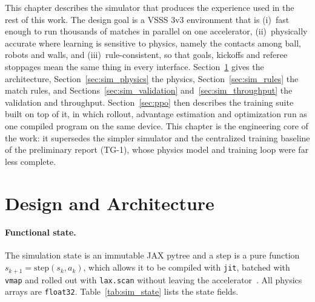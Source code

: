 
This chapter describes the simulator that produces the experience used in the
rest of this work.  The design goal is a VSSS 3v3 environment that is
(i)~fast enough to run thousands of matches in parallel on one accelerator,
(ii)~physically accurate where learning is sensitive to physics, namely the contacts
among ball, robots and walls, and (iii)~rule-consistent, so that goals,
kickoffs and referee stoppages mean the same thing in every interface.
Section~\ref{sec:sim_arch} gives the architecture, Section~\ref{sec:sim_physics}
the physics, Section~\ref{sec:sim_rules} the match rules, and
Sections~\ref{sec:sim_validation} and~\ref{sec:sim_throughput} the validation and
throughput.  Section~\ref{sec:ppo} then describes the training suite built on top of it, in which rollout, advantage estimation and
optimization run as one compiled program on the same device.  This chapter is the engineering core of the work: it supersedes the simpler simulator and the
centralized training baseline of the preliminary report (TG-1), whose physics model and training loop were far less complete.

\section{Design and Architecture}
\label{sec:sim_arch}

\paragraph{Functional state.}
The simulation state is an immutable JAX pytree and a step is a pure function
$s_{k+1} = \mathrm{step}(s_k, a_k)$, which allows it to be compiled with
\texttt{jit}, batched with \texttt{vmap} and rolled out with \texttt{lax.scan}
without leaving the accelerator~\cite{jax2018github}.  All physics arrays are
\texttt{float32}.  Table~\ref{tab:sim_state} lists the state fields.

